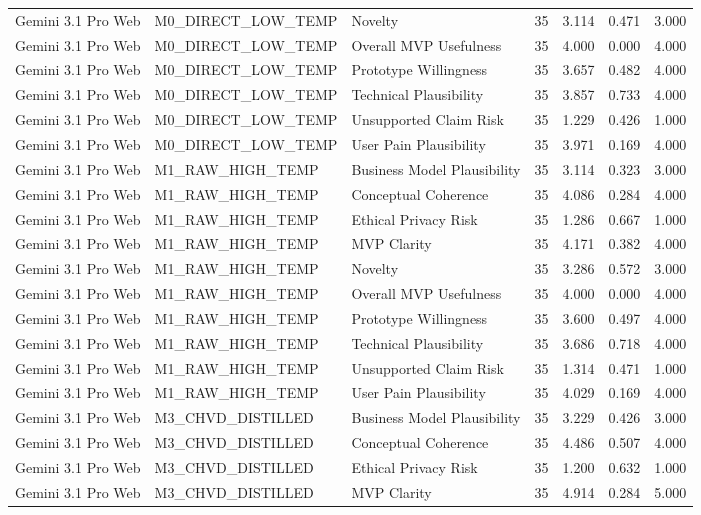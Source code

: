 \documentclass[10pt]{article}
\begin{document}
\begin{landscape}
\begin{longtable}{lllrrrr}
Gemini 3.1 Pro Web & M0\_DIRECT\_LOW\_TEMP & Novelty & 35 & 3.114 & 0.471 & 3.000 \\
Gemini 3.1 Pro Web & M0\_DIRECT\_LOW\_TEMP & Overall MVP Usefulness & 35 & 4.000 & 0.000 & 4.000 \\
Gemini 3.1 Pro Web & M0\_DIRECT\_LOW\_TEMP & Prototype Willingness & 35 & 3.657 & 0.482 & 4.000 \\
Gemini 3.1 Pro Web & M0\_DIRECT\_LOW\_TEMP & Technical Plausibility & 35 & 3.857 & 0.733 & 4.000 \\
Gemini 3.1 Pro Web & M0\_DIRECT\_LOW\_TEMP & Unsupported Claim Risk & 35 & 1.229 & 0.426 & 1.000 \\
Gemini 3.1 Pro Web & M0\_DIRECT\_LOW\_TEMP & User Pain Plausibility & 35 & 3.971 & 0.169 & 4.000 \\
Gemini 3.1 Pro Web & M1\_RAW\_HIGH\_TEMP & Business Model Plausibility & 35 & 3.114 & 0.323 & 3.000 \\
Gemini 3.1 Pro Web & M1\_RAW\_HIGH\_TEMP & Conceptual Coherence & 35 & 4.086 & 0.284 & 4.000 \\
Gemini 3.1 Pro Web & M1\_RAW\_HIGH\_TEMP & Ethical Privacy Risk & 35 & 1.286 & 0.667 & 1.000 \\
Gemini 3.1 Pro Web & M1\_RAW\_HIGH\_TEMP & MVP Clarity & 35 & 4.171 & 0.382 & 4.000 \\
Gemini 3.1 Pro Web & M1\_RAW\_HIGH\_TEMP & Novelty & 35 & 3.286 & 0.572 & 3.000 \\
Gemini 3.1 Pro Web & M1\_RAW\_HIGH\_TEMP & Overall MVP Usefulness & 35 & 4.000 & 0.000 & 4.000 \\
Gemini 3.1 Pro Web & M1\_RAW\_HIGH\_TEMP & Prototype Willingness & 35 & 3.600 & 0.497 & 4.000 \\
Gemini 3.1 Pro Web & M1\_RAW\_HIGH\_TEMP & Technical Plausibility & 35 & 3.686 & 0.718 & 4.000 \\
Gemini 3.1 Pro Web & M1\_RAW\_HIGH\_TEMP & Unsupported Claim Risk & 35 & 1.314 & 0.471 & 1.000 \\
Gemini 3.1 Pro Web & M1\_RAW\_HIGH\_TEMP & User Pain Plausibility & 35 & 4.029 & 0.169 & 4.000 \\
Gemini 3.1 Pro Web & M3\_CHVD\_DISTILLED & Business Model Plausibility & 35 & 3.229 & 0.426 & 3.000 \\
Gemini 3.1 Pro Web & M3\_CHVD\_DISTILLED & Conceptual Coherence & 35 & 4.486 & 0.507 & 4.000 \\
Gemini 3.1 Pro Web & M3\_CHVD\_DISTILLED & Ethical Privacy Risk & 35 & 1.200 & 0.632 & 1.000 \\
Gemini 3.1 Pro Web & M3\_CHVD\_DISTILLED & MVP Clarity & 35 & 4.914 & 0.284 & 5.000 \\

\end{longtable}
\end{landscape}
\end{document}
